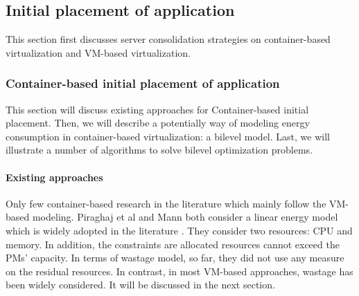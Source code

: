


\subsection{Initial placement of application}
\label{sec:initial}

This section first discusses server consolidation strategies on container-based virtualization and VM-based virtualization.




\subsubsection{Container-based initial placement of application}
\label{container-based-placement}
This section will discuss existing approaches for Container-based initial placement. Then, we will describe a potentially way of modeling energy consumption in container-based virtualization: a bilevel model. Last, we will illustrate a number of algorithms to solve bilevel optimization problems. 


\paragraph{Existing approaches}
Only few container-based research in the literature which mainly follow the VM-based modeling. Piraghaj et al \cite{Piraghaj:2016bw} and Mann \cite{Mann:2016hx} both consider a linear energy model which is widely adopted in the literature \cite{Xavier:2017jl}. They consider two resources: CPU and memory. In addition, the constraints are allocated resources cannot exceed the PMs' capacity. In terms of wastage model, so far, they did not use any measure on the residual resources. In contrast, in most VM-based approaches, wastage has been widely considered. It will be discussed in the next section.  

